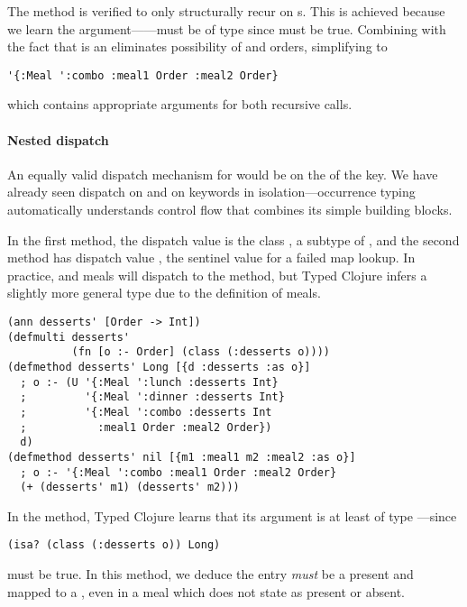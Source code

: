The  method is verified to only structurally recur
on s. This is achieved because we learn the argument------must %
be of type
since
must be true. Combining 
with the fact that  is an 
eliminates possibility of  and 
orders, simplifying  to
\begin{verbatim}
'{:Meal ':combo :meal1 Order :meal2 Order}
\end{verbatim}
which contains appropriate arguments for both recursive calls.

\paragraph{Nested dispatch}
An equally valid dispatch mechanism for 
would be on the  of the  key.
We have already seen dispatch on  and on keywords
in isolation---occurrence typing automatically understands
control flow that combines its simple building blocks.

In the first method, the dispatch value is the class , a subtype
of , and the second method has dispatch value , the sentinel value for a failed map lookup.
In practice,  and  meals will dispatch to the 
method, but Typed Clojure infers a slightly more general type due to the definition
of  meals.

\begin{exmp}
\begin{verbatim}
(ann desserts' [Order -> Int])
(defmulti desserts' 
          (fn [o :- Order] (class (:desserts o))))
(defmethod desserts' Long [{d :desserts :as o}] 
  ; o :- (U '{:Meal ':lunch :desserts Int}
  ;         '{:Meal ':dinner :desserts Int}
  ;         '{:Meal ':combo :desserts Int
  ;           :meal1 Order :meal2 Order})
  d)
(defmethod desserts' nil [{m1 :meal1 m2 :meal2 :as o}]
  ; o :- '{:Meal ':combo :meal1 Order :meal2 Order}
  (+ (desserts' m1) (desserts' m2)))
\end{verbatim}
\label{example:desserts-on-class}
\end{exmp}
%

In the  method, Typed Clojure learns that
its argument is at least of type ---since
\begin{verbatim}
(isa? (class (:desserts o)) Long)
\end{verbatim}
must be true.
%
In this method, we deduce
the entry 
\emph{must} be a present and mapped to a ,
even in a  meal
which does not state 
as present or absent.

